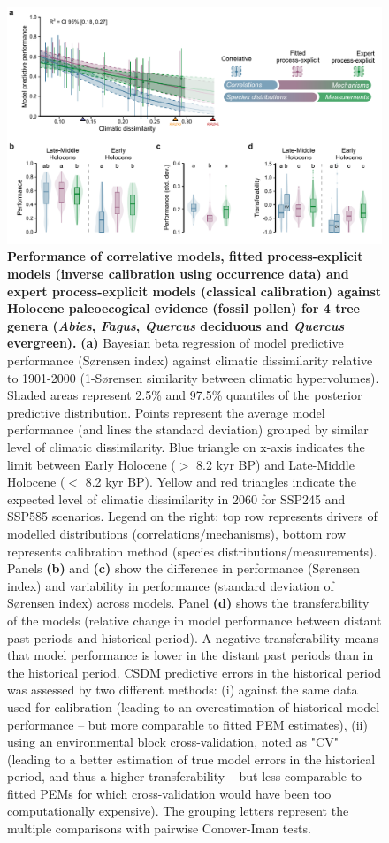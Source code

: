 \begin{figure}[ht!]
\hspace*{-0.6cm}
\centering
\includegraphics[width=17cm]{chapter2/figs/past_performance.pdf}
\caption{\textbf{Performance of correlative models, fitted process-explicit models (inverse calibration using occurrence data) and expert process-explicit models (classical calibration) against Holocene paleoecogical evidence (fossil pollen) for 4 tree genera (\emph{Abies}, \emph{Fagus}, \emph{Quercus} deciduous and \emph{Quercus} evergreen).} \textbf{(a)} Bayesian beta regression of model predictive performance (Sørensen index) against climatic dissimilarity relative to 1901-2000 (1-Sørensen similarity between climatic hypervolumes). Shaded areas represent 2.5\% and 97.5\% quantiles of the posterior predictive distribution. Points represent the average model performance (and lines the standard deviation) grouped by similar level of climatic dissimilarity. Blue triangle on x-axis indicates the limit between Early Holocene ($>$ 8.2 kyr BP) and Late-Middle Holocene ($<$ 8.2 kyr BP). Yellow and red triangles indicate the expected level of climatic dissimilarity in 2060 for SSP245 and SSP585 scenarios. Legend on the right: top row represents drivers of modelled distributions (correlations/mechanisms), bottom row represents calibration method (species distributions/measurements). Panels \textbf{(b)} and \textbf{(c)} show the difference in performance (Sørensen index) and variability in performance (standard deviation of Sørensen index) across models. Panel \textbf{(d)} shows the transferability of the models (relative change in model performance between distant past periods and historical period). A negative transferability means that model performance is lower in the distant past periods than in the historical period. CSDM predictive errors in the historical period was assessed by two different methods: (i) against the same data used for calibration (leading to an overestimation of historical model performance -- but more comparable to fitted PEM estimates), (ii) using an environmental block cross-validation, noted as "CV" (leading to a better estimation of true model errors in the historical period, and thus a higher transferability -- but less comparable to fitted PEMs for which cross-validation would have been too computationally expensive). The grouping letters represent the multiple comparisons with pairwise Conover-Iman tests.}

\end{figure}
